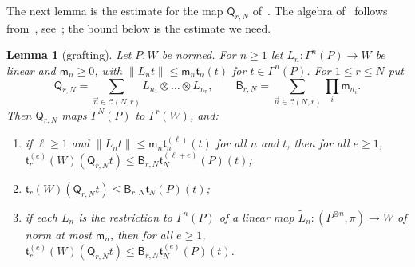\documentclass[11pt]{amsart}
\newtheorem{lemma}[theorem]{Lemma}
\theoremstyle{definition}
\theoremstyle{remark}
\numberwithin{equation}{section}
\newcommand{\norm}[1]{\lVert #1\rVert}
\theoremstyle{plain}
\theoremstyle{definition}
\theoremstyle{plain}
\begin{document}
The next lemma is the estimate for the map $\mathsf Q_{r,N}$ of~\cite[(Q.8)]{I}. The algebra of~\cite[(Q.8)]{I} follows from~\cite[VI~\S8, Prop.~VI.6, Cor.; Prop.~I.2; II~\S1]{Ro}, see~\cite[Section~Q.4]{I}; the bound below is the estimate we need.

\begin{lemma}[grafting]\label{dp:lem:grafting}
Let $P,W$ be normed. For $n\ge1$ let $L_n\colon\Gamma^n(P)\to W$ be linear and $\mathsf m_n\ge0$, with $\norm{L_nt}\le\mathsf m_n\mathfrak t_n(t)$ for $t\in\Gamma^n(P)$. For $1\le r\le N$ put
\[
 \mathsf Q_{r,N}=\sum_{\vec n\in\mathcal C(N,r)}L_{n_1}\otimes\dots\otimes L_{n_r},\qquad
 \mathsf B_{r,N}=\sum_{\vec n\in\mathcal C(N,r)}\prod_i\mathsf m_{n_i}.
\]
Then $\mathsf Q_{r,N}$ maps $\Gamma^N(P)$ to $\Gamma^r(W)$, and:
\begin{enumerate}
\item if $\ell\ge1$ and $\norm{L_nt}\le\mathsf m_n\mathfrak t^{(\ell)}_n(t)$ for all $n$ and $t$, then for all $e\ge1$, $\mathfrak t^{(e)}_r(W)(\mathsf Q_{r,N}t)\le\mathsf B_{r,N}\mathfrak t^{(\ell+e)}_N(P)(t)$;
\item $\mathfrak t_r(W)(\mathsf Q_{r,N}t)\le\mathsf B_{r,N}\mathfrak t_N(P)(t)$;
\item if each $L_n$ is the restriction to $\Gamma^n(P)$ of a linear map $\tilde L_n\colon(P^{\otimes n},\pi)\to W$ of norm at most $\mathsf m_n$, then for all $e\ge1$, $\mathfrak t^{(e)}_r(W)(\mathsf Q_{r,N}t)\le\mathsf B_{r,N}\mathfrak t^{(e)}_N(P)(t)$.
\end{enumerate}
\end{lemma}
\end{document}
